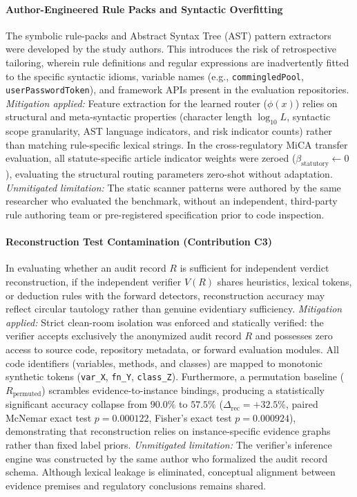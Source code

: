 \paragraph{Author-Engineered Rule Packs and Syntactic Overfitting}
The symbolic rule-packs and Abstract Syntax Tree (AST) pattern extractors were developed by the study authors. This introduces the risk of retrospective tailoring, wherein rule definitions and regular expressions are inadvertently fitted to the specific syntactic idioms, variable names (e.g., \texttt{commingledPool}, \texttt{userPasswordToken}), and framework APIs present in the evaluation repositories.
\textit{Mitigation applied:} Feature extraction for the learned router ($\phi(x)$) relies on structural and meta-syntactic properties (character length $\log_{10} L$, syntactic scope granularity, AST language indicators, and risk indicator counts) rather than matching rule-specific lexical strings. In the cross-regulatory MiCA transfer evaluation, all statute-specific article indicator weights were zeroed ($\beta_{\text{statutory}} \leftarrow 0$), evaluating the structural routing parameters zero-shot without adaptation.
\textit{Unmitigated limitation:} The static scanner patterns were authored by the same researcher who evaluated the benchmark, without an independent, third-party rule authoring team or pre-registered specification prior to code inspection.

\paragraph{Reconstruction Test Contamination (Contribution C3)}
In evaluating whether an audit record $R$ is sufficient for independent verdict reconstruction, if the independent verifier $V(R)$ shares heuristics, lexical tokens, or deduction rules with the forward detectors, reconstruction accuracy may reflect circular tautology rather than genuine evidentiary sufficiency.
\textit{Mitigation applied:} Strict clean-room isolation was enforced and statically verified: the verifier accepts exclusively the anonymized audit record $R$ and possesses zero access to source code, repository metadata, or forward evaluation modules. All code identifiers (variables, methods, and classes) are mapped to monotonic synthetic tokens (\texttt{var\_X}, \texttt{fn\_Y}, \texttt{class\_Z}). Furthermore, a permutation baseline ($R_{\text{permuted}}$) scrambles evidence-to-instance bindings, producing a statistically significant accuracy collapse from $90.0\%$ to $57.5\%$ ($\Delta_{\text{rec}} = +32.5\%$, paired McNemar exact test $p = 0.000122$, Fisher's exact test $p = 0.000924$), demonstrating that reconstruction relies on instance-specific evidence graphs rather than fixed label priors.
\textit{Unmitigated limitation:} The verifier's inference engine was constructed by the same author who formalized the audit record schema. Although lexical leakage is eliminated, conceptual alignment between evidence premises and regulatory conclusions remains shared.

